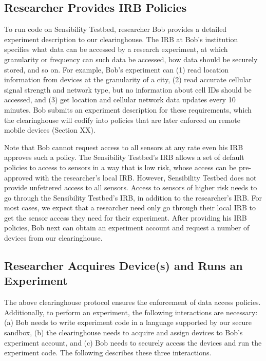 \subsection{Researcher Provides IRB
Policies}\label{sec-irb-policy}

To run code on Sensibility Testbed, researcher Bob provides a
detailed experiment description to our clearinghouse. The IRB at
Bob's institution specifies what data can be accessed by a
research experiment, at which granularity or frequency can such
data be accessed, how data should be securely stored, and so on.
For example, Bob's experiment can (1) read location information
from devices at the granularity of a city, (2) read accurate
cellular signal strength and network type, but no information
about cell IDs should be accessed, and (3) get location and
cellular network data updates every 10 minutes. Bob submits an
experiment description for these requirements, which the
clearinghouse will codify into policies that are later enforced
on remote mobile devices (Section XX).

Note that Bob cannot request access to all sensors at any rate
even his IRB approves such a policy. The Sensibility Testbed's
IRB allows a set of default policies to access to sensors in a
way that is low risk, whose access can be pre-approved with the
researcher's local IRB. However, Sensibility Testbed does not
provide unfettered access to all sensors. Access to sensors of
higher risk needs to go through the Sensibility Testbed's IRB,
in addition to the researcher's IRB. For most cases, we expect
that a researcher need only go through their local IRB to get
the sensor access they need for their experiment. After
providing his IRB policies, Bob next can obtain an experiment
account and request a number of devices from our clearinghouse.

\subsection{Researcher Acquires Device(s) and Runs an
Experiment}

The above clearinghouse protocol ensures the enforcement of data
access policies. Additionally, to perform an experiment, the
following interactions are necessary: (a) Bob needs to write
experiment code in a language supported by our secure sandbox,
(b) the clearinghouse needs to acquire and assign devices to
Bob's experiment account, and (c) Bob needs to securely access
the devices and run the experiment code. The following describes
these three interactions.

